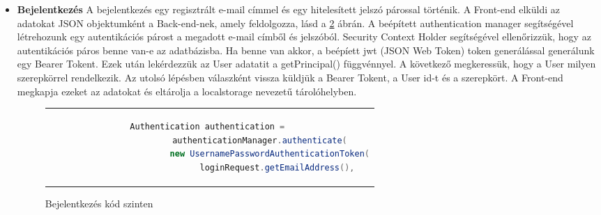 \begin{itemize}
A sikeres ellenőrzések után következik a jelszó elmentése az adatbázisba, amelyre láthatunk kód részletet a \ref{passSaving} ábrán. Látható a kódnak a 4. sorában, hogy egy encoder segítségével kódoljuk a jelszót és csak úgy mentjük el az adatbázisba.
	\begin{figure}[thp]
		\centering
		\caption{Jelszó mentése}
		\label{passSaving}
		\begin{tabular}{c}
			\begin{lstlisting}[language=JAVA]
				Iterator<User> itr = registartion.getUser().iterator();
				BCryptPasswordEncoder passwordEncoder = 
						new BCryptPasswordEncoder();
				String encodedPassword = passwordEncoder.encode(
					passwordRequest.getPassword()
				);
				User user = userRepository.findById(itr.next()
							  .getId()
							  .toHexString())
							 .orElseThrow(() -> new RuntimeException(
									"Error: User is not found."
							  ));
				user.setPassword(encodedPassword);
				userRepository.save(user);
				registartion.setEnable(true);
				registartionRepository.save(registartion);
			\end{lstlisting}
		\end{tabular}
	\end{figure}
\pagebreak
	\item \textbf{Bejelentkezés} 
A bejelentkezés egy regisztrált e-mail címmel és egy hitelesített jelszó párossal történik. A Front-end elküldi az adatokat JSON objektumként a Back-end-nek, amely feldolgozza, lásd a \ref{login} ábrán. A beépített authentication manager segítségével létrehozunk egy autentikációs párost a megadott e-mail címből és jelszóból. Security Context Holder segítségével ellenőrizzük, hogy az autentikációs páros benne van-e az adatbázisba. Ha benne van akkor, a beépíett jwt (JSON Web Token) token generálással generálunk egy Bearer Tokent. Ezek után lekérdezzük az User adatatit a getPrincipal() függvénnyel. A következő megkeressük, hogy a User milyen szerepkörrel rendelkezik. Az utolsó lépésben válaszként vissza küldjük a Bearer Tokent, a User id-t és a szerepkört. A Front-end megkapja ezeket az adatokat és eltárolja a localstorage nevezetű tárolóhelyben. 
	\begin{figure}[thp]
		\centering
		\caption{Bejelentkezés kód szinten}
		\label{login}
		\begin{tabular}{c}
			\begin{lstlisting}[language=JAVA]
				Authentication authentication = 
					authenticationManager.authenticate(
						new UsernamePasswordAuthenticationToken(
							loginRequest.getEmailAddress(), 

\end{lstlisting}
\end{tabular}
\end{figure}
\end{itemize}
